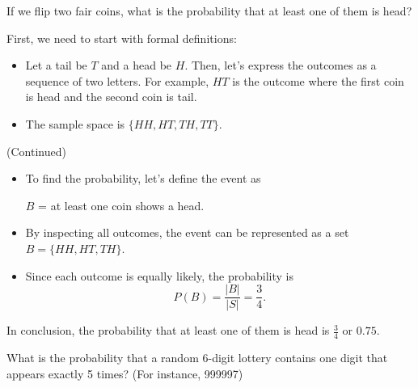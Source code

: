 

\begin{frame}[t]
\begin{ex}
If we flip two fair coins, what is the probability that at least one of them is head?
\end{ex}
\begin{sol}
First, we need to start with formal definitions:
\begin{itemize}
\item Let a tail be $T$ and a head be $H$. Then, let's express the outcomes as a sequence of two letters. For example, $HT$ is the outcome where the first coin is head and the second coin is tail.
\item The sample space is $\{ HH, HT, TH, TT\}$. \pause
\end{itemize}
\end{sol}
\end{frame}

\begin{frame}
\begin{sol} (Continued)
\begin{itemize}
\item To find the probability, let's define the event as
\begin{center}
$B$ = at least one coin shows a head.
\end{center}
\item By inspecting all outcomes, the event can be represented as a set $B = \{HH, HT, TH\}$.
\item Since each outcome is equally likely, the probability is
\[P(B) = \frac{|B|}{|S|} = \frac{3}{4}.\]
\end{itemize}
In conclusion, the probability that at least one of them is head is $\frac{3}{4}$ or $0.75$.
\end{sol}
\end{frame}



\begin{frame}[t]
\begin{ex}
What is the probability that a random 6-digit lottery contains one digit that appears exactly 5 times? (For instance, 999997)
\end{ex}
\end{frame}


